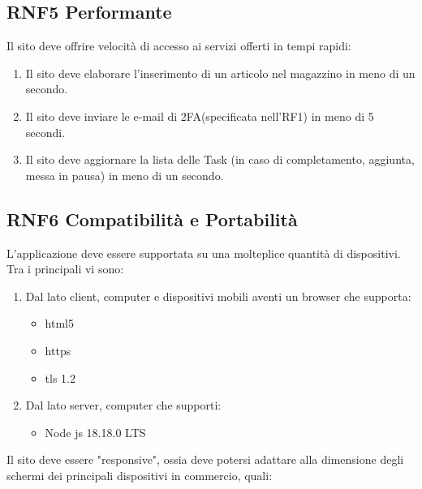 \documentclass{report}
\begin{document}
\subsection*{RNF5 Performante}
Il sito deve offrire velocità di accesso ai servizi offerti in tempi rapidi:
\begin{enumerate}
	\item Il sito deve elaborare l'inserimento di un articolo nel magazzino in meno di un secondo.
	\item Il sito deve inviare le e-mail di 2FA(specificata nell'RF1) in meno di 5 secondi.
	\item Il sito deve aggiornare la lista delle Task (in caso di completamento, aggiunta, messa in pausa) in meno di un secondo.
\end{enumerate}

\subsection*{RNF6 Compatibilità e Portabilità}
L'applicazione deve essere supportata su una molteplice quantità di dispositivi.
Tra i principali vi sono:
\begin{enumerate}
	\item Dal lato client, computer e dispositivi mobili aventi un browser che supporta:
    \begin{itemize}
		\item html5
		\item https
		\item tls 1.2
	\end{itemize}
	\item Dal lato server, computer che supporti:
	\begin{itemize}
		\item Node js 18.18.0 LTS
	\end{itemize}
\end{enumerate}
Il sito deve essere "responsive", ossia deve potersi adattare alla dimensione degli schermi dei principali dispositivi in commercio, quali:
\end{document}
